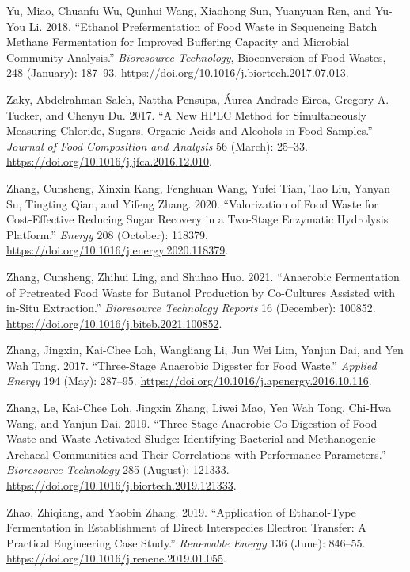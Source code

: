 \documentclass[11pt]{report}
\begin{document}
\begin{hangparas}{1.5em}{1}
\hypertarget{citeproc_bib_item_92}{Yu, Miao, Chuanfu Wu, Qunhui Wang, Xiaohong Sun, Yuanyuan Ren, and Yu-You Li. 2018. “Ethanol Prefermentation of Food Waste in Sequencing Batch Methane Fermentation for Improved Buffering Capacity and Microbial Community Analysis.” \textit{Bioresource Technology}, Bioconversion of Food Wastes, 248 (January): 187–93. \url{https://doi.org/10.1016/j.biortech.2017.07.013}.}

\hypertarget{citeproc_bib_item_93}{Zaky, Abdelrahman Saleh, Nattha Pensupa, Áurea Andrade-Eiroa, Gregory A. Tucker, and Chenyu Du. 2017. “A New HPLC Method for Simultaneously Measuring Chloride, Sugars, Organic Acids and Alcohols in Food Samples.” \textit{Journal of Food Composition and Analysis} 56 (March): 25–33. \url{https://doi.org/10.1016/j.jfca.2016.12.010}.}

\hypertarget{citeproc_bib_item_94}{Zhang, Cunsheng, Xinxin Kang, Fenghuan Wang, Yufei Tian, Tao Liu, Yanyan Su, Tingting Qian, and Yifeng Zhang. 2020. “Valorization of Food Waste for Cost-Effective Reducing Sugar Recovery in a Two-Stage Enzymatic Hydrolysis Platform.” \textit{Energy} 208 (October): 118379. \url{https://doi.org/10.1016/j.energy.2020.118379}.}

\hypertarget{citeproc_bib_item_95}{Zhang, Cunsheng, Zhihui Ling, and Shuhao Huo. 2021. “Anaerobic Fermentation of Pretreated Food Waste for Butanol Production by Co-Cultures Assisted with in-Situ Extraction.” \textit{Bioresource Technology Reports} 16 (December): 100852. \url{https://doi.org/10.1016/j.biteb.2021.100852}.}

\hypertarget{citeproc_bib_item_96}{Zhang, Jingxin, Kai-Chee Loh, Wangliang Li, Jun Wei Lim, Yanjun Dai, and Yen Wah Tong. 2017. “Three-Stage Anaerobic Digester for Food Waste.” \textit{Applied Energy} 194 (May): 287–95. \url{https://doi.org/10.1016/j.apenergy.2016.10.116}.}

\hypertarget{citeproc_bib_item_97}{Zhang, Le, Kai-Chee Loh, Jingxin Zhang, Liwei Mao, Yen Wah Tong, Chi-Hwa Wang, and Yanjun Dai. 2019. “Three-Stage Anaerobic Co-Digestion of Food Waste and Waste Activated Sludge: Identifying Bacterial and Methanogenic Archaeal Communities and Their Correlations with Performance Parameters.” \textit{Bioresource Technology} 285 (August): 121333. \url{https://doi.org/10.1016/j.biortech.2019.121333}.}

\hypertarget{citeproc_bib_item_98}{Zhao, Zhiqiang, and Yaobin Zhang. 2019. “Application of Ethanol-Type Fermentation in Establishment of Direct Interspecies Electron Transfer: A Practical Engineering Case Study.” \textit{Renewable Energy} 136 (June): 846–55. \url{https://doi.org/10.1016/j.renene.2019.01.055}.}


\end{hangparas}
\end{document}
